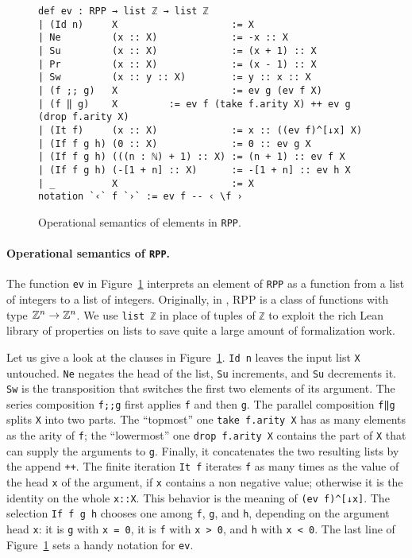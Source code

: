 \documentclass[runningheads]{llncs}
\newcommand{\RPP}{\textsf{RPP}\xspace}
\newcommand{\LEAN}{\textsf{Lean}\xspace}
\begin{document}
\begin{figure}
\begin{lstlisting}
def ev : RPP → list ℤ → list ℤ
| (Id n)     X                    := X
| Ne         (x :: X)             := -x :: X
| Su         (x :: X)             := (x + 1) :: X
| Pr         (x :: X)             := (x - 1) :: X
| Sw         (x :: y :: X)        := y :: x :: X
| (f ;; g)   X                    := ev g (ev f X)
| (f ‖ g)    X         := ev f (take f.arity X) ++ ev g (drop f.arity X)
| (It f)     (x :: X)             := x :: ((ev f)^[↓x] X)
| (If f g h) (0 :: X)             := 0 :: ev g X
| (If f g h) (((n : ℕ) + 1) :: X) := (n + 1) :: ev f X
| (If f g h) (-[1 + n] :: X)      := -[1 + n] :: ev h X
| _          X                    := X
notation `‹` f `›` := ev f -- ‹ \f ›
\end{lstlisting}
\caption{Operational semantics of elements in \lstinline|RPP|.}
\label{fig:RPP-ev}
\end{figure}

\paragraph{Operational semantics of {\normalfont \lstinline|RPP|}.}
The function \lstinline|ev| in Figure~\ref{fig:RPP-ev} interprets an element of \lstinline|RPP| as a function from a list of integers to a list of integers. Originally, in \cite{DBLP:journals/tcs/PaoliniPR20}, \RPP is a class of functions with type $ \mathbb{Z}^n \rightarrow \mathbb{Z}^n $. We use \lstinline|list ℤ| in place of tuples of \lstinline|ℤ| to exploit the rich \LEAN library of properties on lists to save quite a large amount of formalization work.

Let us give a look at the clauses in Figure~\ref{fig:RPP-ev}.
\lstinline|Id n| leaves the input list \lstinline|X| untouched.
\lstinline|Ne| negates the head of the list, \lstinline|Su| increments, and \lstinline|Su| decrements it.
\lstinline|Sw| is the transposition that switches the first two elements of its argument.
The series composition \lstinline|f;;g| first applies \lstinline|f| and then
\lstinline|g|.
The parallel composition \lstinline|f‖g| splits \lstinline|X| into two parts. The ``topmost'' one \lstinline|take f.arity X| has as many elements as the arity of \lstinline|f|; the ``lowermost'' one \lstinline|drop f.arity X| contains the part of \lstinline|X| that can supply the arguments to \lstinline|g|. Finally, it concatenates the two resulting lists by the append \lstinline|++|. The finite iteration
\lstinline|It f| iterates \lstinline|f| as many times as the value of the head \lstinline|x| of the argument, if \lstinline|x| contains a non negative value; otherwise it is the identity on the whole \lstinline|x::X|. This behavior is the meaning of \lstinline|(ev f)^[↓x]|.
The selection \lstinline|If f g h| chooses one among \lstinline|f|, \lstinline|g|, and \lstinline|h|, depending on the argument head \lstinline|x|: it is \lstinline|g| with \lstinline|x = 0|, it is \lstinline|f| with \lstinline|x > 0|, and \lstinline|h| with \lstinline|x < 0|.
The last line of Figure~\ref{fig:RPP-ev} sets a handy notation for \lstinline|ev|.
\end{document}
